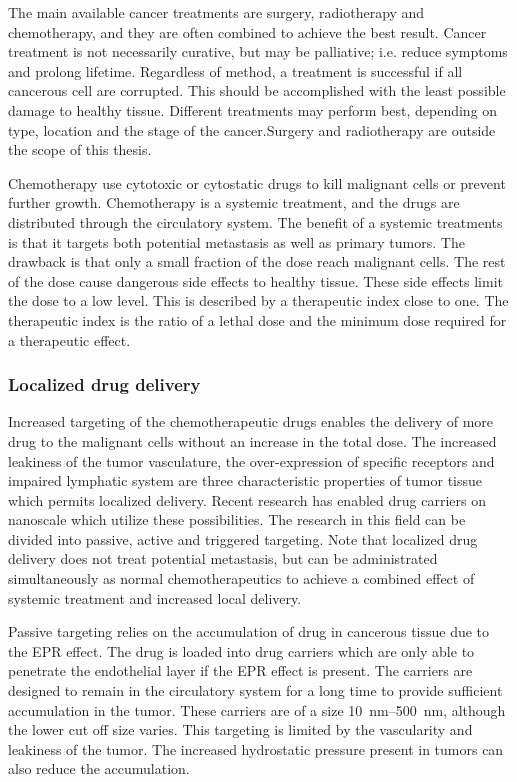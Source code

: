 The main available cancer treatments are surgery, radiotherapy and chemotherapy, and they are often combined to achieve the best result. Cancer treatment is not necessarily curative, but may be palliative; i.e. reduce symptoms and prolong lifetime. Regardless of method, a treatment is successful if all cancerous cell are corrupted. This should be accomplished with the least possible damage to healthy tissue. Different treatments may perform best, depending on type, location and the stage of the cancer.Surgery and radiotherapy are outside the scope of this thesis.

Chemotherapy use cytotoxic or cytostatic drugs to kill malignant cells or prevent further growth\cite{Skeel2011}. Chemotherapy is a systemic treatment, and the drugs are distributed through the circulatory system. The benefit of a systemic treatments is that it targets both potential metastasis as well as primary tumors. The drawback is that only a small fraction of the dose reach malignant cells. The rest of the dose cause dangerous side effects to healthy tissue\cite{doi:10.1056/NEJM200106283442607}. These side effects limit the dose to a low level. This is described by a therapeutic index close to one. The therapeutic index is the ratio of a lethal dose and the minimum dose required for a therapeutic effect.
 
\subsubsection{Localized drug delivery}
Increased targeting of the chemotherapeutic drugs enables the delivery of more drug to the malignant cells without an increase in the total dose. The increased leakiness of the tumor vasculature, the over-expression of specific receptors and impaired lymphatic system are three characteristic properties of tumor tissue which permits localized delivery. Recent research has enabled drug carriers on nanoscale which utilize these possibilities\cite{Jafari}. The research in this field can be divided into passive, active and triggered targeting. Note that localized drug delivery does not treat potential metastasis, but can be administrated simultaneously as normal chemotherapeutics to achieve a combined effect of systemic treatment and increased local delivery.

Passive targeting relies on the accumulation of drug in cancerous tissue due to the EPR effect. The drug is loaded into drug carriers which are only able to penetrate the endothelial layer if the EPR effect is present\cite{Andresen2010}. The carriers are designed to remain in the circulatory system for a long time to provide sufficient accumulation in the tumor. These carriers are of a size \SIrange{10}{500}{\nano\meter}, although the lower cut off size varies\cite{Hofmann}. This targeting is limited by the vascularity and leakiness of the tumor. The increased hydrostatic pressure present in tumors can also reduce the accumulation\cite{Bae2009}.  


